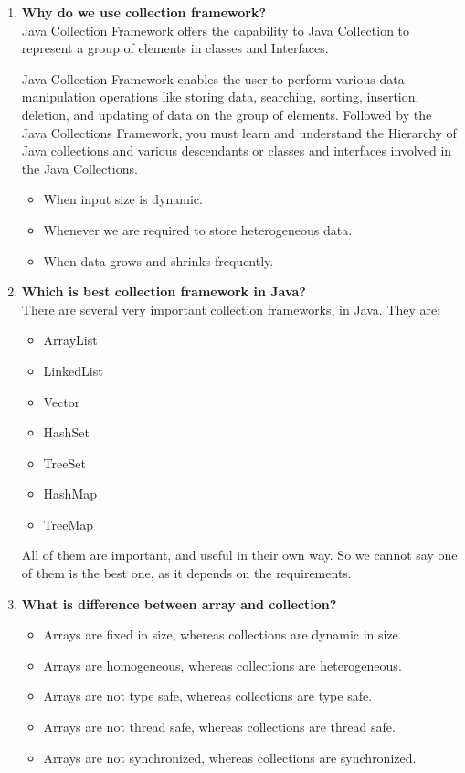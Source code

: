 \documentclass[11pt]{article}
\begin{document}
\begin{enumerate}
	\item \textbf{Why do we use collection framework?}\\
	Java Collection Framework offers the capability to Java Collection to represent a group of elements in classes and Interfaces.

	Java Collection Framework enables the user to perform various data manipulation operations like storing data, searching, sorting, insertion, deletion, and updating of data on the group of elements. Followed by the Java Collections Framework, you must learn and understand the Hierarchy of Java collections and various descendants or classes and interfaces involved in the Java Collections.
	\begin{itemize}
		\item When input size is dynamic.
		\item Whenever we are required to store heterogeneous data.
		\item When data grows and shrinks frequently.
	\end{itemize}
	\item \textbf{Which is best collection framework in Java?}\\
	There are several very important collection frameworks, in Java. They are:
	\begin{itemize}
		\item ArrayList
		\item LinkedList
		\item Vector
		\item HashSet
		\item TreeSet
		\item HashMap
		\item TreeMap
	\end{itemize}
	All of them are important, and useful in their own way. So we cannot say one of them is the best one, as it depends on the requirements. 
	\item \textbf{What is difference between array and collection?}\\
	\begin{itemize}
		\item Arrays are fixed in size, whereas collections are dynamic in size.
		\item Arrays are homogeneous, whereas collections are heterogeneous.
		\item Arrays are not type safe, whereas collections are type safe.
		\item Arrays are not thread safe, whereas collections are thread safe.
		\item Arrays are not synchronized, whereas collections are synchronized.
	\end{itemize}
	

\end{enumerate}
\end{document}

